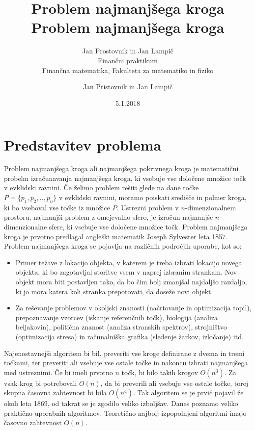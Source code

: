 \documentclass[a4paper]{article}
\title{Problem najmanjšega kroga}
\author{Jan Prostovnik in Jan Lampič\\ Finančni praktikum \\ Finančna matematika, Fakulteta za matematiko in fiziko}
\date{5.1.2018}
\begin{document}
\title{ Problem najmanjšega kroga}

\author{Jan Pristovnik in Jan Lampič}

\maketitle

\pagebreak

\section{Predstavitev problema}

Problem najmanjšega kroga ali najmanjšega pokrivnega kroga je matematični probelm izračunavanja najmanjšega kroga, ki vsebuje vse določene množice točk v evklidski ravnini. Če želimo problem rešiti glede na dane točke $P = \{p_1,p_2,..,p_n\}$ v evklidski ravnini,  moramo poiskati središče in polmer kroga, ki bo vseboval vse točke iz množice $P$. 
Ustrezni problem v $n$-dimenzionalnem prostoru, najmanjši problem z omejevalno sfero, je izračun najmanjše $n$-dimenzionalne sfere, ki vsebuje vse določene množice točk. Problem najmanjšega kroga je prvotno predlagal angleški matematik Joseph Sylvester leta 1857.\\ 
Problem najmanjšega kroga se pojavlja na različnih področjih uporabe, kot so:
\begin{itemize}
\item Primer težave z lokacijo objekta, v katerem je treba izbrati lokacijo novega objekta, ki bo zagotavljal storitve vsem v naprej izbranim strankam. Nov objekt mora biti postavljen tako, da bo čim bolj zmanjšal najdaljšo razdaljo, ki jo mora katera koli stranka prepotovati, da doseže novi objekt.
\item Za reševanje problemov v okoljski znanosti (načrtovanje in optimizacija topil), prepoznavanje vzorcev (iskanje referenčnih točk), biologija (analiza beljakovin), politična znanost (analiza stranskih spektrov), strojništvo (optimizacija stresa) in računalniška grafika (sledenje žarkov, izločanje) itd.
\end{itemize}
Najenostavnejši algoritem bi bil, preveriti vse kroge definirane z dvema in tremi točkami, ter preveriti ali vsebuje vse ostale točke in nakoncu izbrati najmanjšega med ustreznimi.  Če bi imeli prvotno $n$ točk, bi bilo takih krogov $O(n^3)$. Za vsak krog bi potrebovali $O(n)$, da bi preverili ali vsebuje vse ostale točke, torej skupna časovna zahtevnost bi bila $O(n^4)$. Tak algoritem se je prvič pojavil že okoli leta 1869, od takrat se je zgodilo veliko izboljšav. Danes poznamo veliko praktično uporabnih algoritmov. Teoretično najbolj izpopolnjeni algoritmi imajo časovno zahtevnost $O(n)$.  
\end{document}
